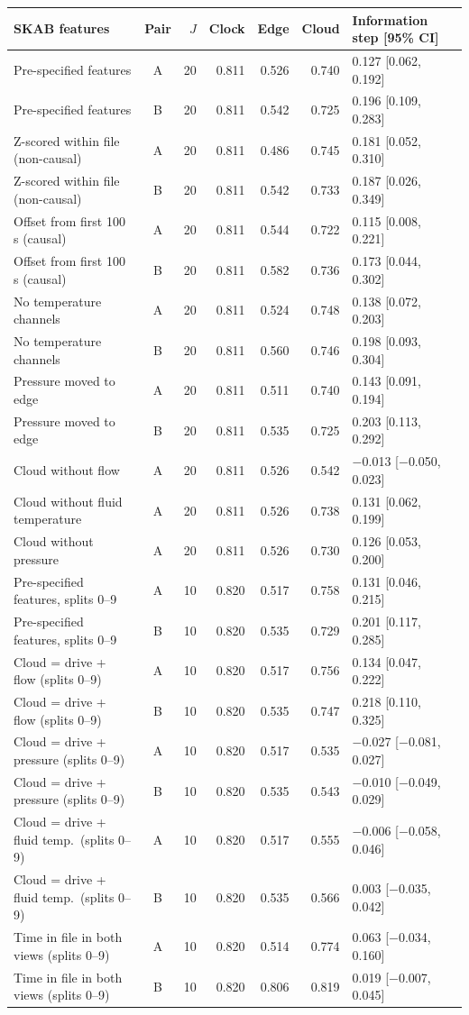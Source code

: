 \begin{tabular}{@{}l c r rrr l@{}}
\toprule
SKAB features & Pair & $J$ & Clock & Edge & Cloud & Information step [95\% CI] \\
\midrule
Pre-specified features & A & 20 & 0.811 & 0.526 & 0.740 & 0.127 [0.062, 0.192] \\
Pre-specified features & B & 20 & 0.811 & 0.542 & 0.725 & 0.196 [0.109, 0.283] \\
Z-scored within file (non-causal) & A & 20 & 0.811 & 0.486 & 0.745 & 0.181 [0.052, 0.310] \\
Z-scored within file (non-causal) & B & 20 & 0.811 & 0.542 & 0.733 & 0.187 [0.026, 0.349] \\
Offset from first 100 s (causal) & A & 20 & 0.811 & 0.544 & 0.722 & 0.115 [0.008, 0.221] \\
Offset from first 100 s (causal) & B & 20 & 0.811 & 0.582 & 0.736 & 0.173 [0.044, 0.302] \\
No temperature channels & A & 20 & 0.811 & 0.524 & 0.748 & 0.138 [0.072, 0.203] \\
No temperature channels & B & 20 & 0.811 & 0.560 & 0.746 & 0.198 [0.093, 0.304] \\
Pressure moved to edge & A & 20 & 0.811 & 0.511 & 0.740 & 0.143 [0.091, 0.194] \\
Pressure moved to edge & B & 20 & 0.811 & 0.535 & 0.725 & 0.203 [0.113, 0.292] \\
Cloud without flow & A & 20 & 0.811 & 0.526 & 0.542 & $-$0.013 [$-$0.050, 0.023] \\
Cloud without fluid temperature & A & 20 & 0.811 & 0.526 & 0.738 & 0.131 [0.062, 0.199] \\
Cloud without pressure & A & 20 & 0.811 & 0.526 & 0.730 & 0.126 [0.053, 0.200] \\
Pre-specified features, splits 0--9 & A & 10 & 0.820 & 0.517 & 0.758 & 0.131 [0.046, 0.215] \\
Pre-specified features, splits 0--9 & B & 10 & 0.820 & 0.535 & 0.729 & 0.201 [0.117, 0.285] \\
Cloud = drive + flow (splits 0--9) & A & 10 & 0.820 & 0.517 & 0.756 & 0.134 [0.047, 0.222] \\
Cloud = drive + flow (splits 0--9) & B & 10 & 0.820 & 0.535 & 0.747 & 0.218 [0.110, 0.325] \\
Cloud = drive + pressure (splits 0--9) & A & 10 & 0.820 & 0.517 & 0.535 & $-$0.027 [$-$0.081, 0.027] \\
Cloud = drive + pressure (splits 0--9) & B & 10 & 0.820 & 0.535 & 0.543 & $-$0.010 [$-$0.049, 0.029] \\
Cloud = drive + fluid temp.\ (splits 0--9) & A & 10 & 0.820 & 0.517 & 0.555 & $-$0.006 [$-$0.058, 0.046] \\
Cloud = drive + fluid temp.\ (splits 0--9) & B & 10 & 0.820 & 0.535 & 0.566 & 0.003 [$-$0.035, 0.042] \\
Time in file in both views (splits 0--9) & A & 10 & 0.820 & 0.514 & 0.774 & 0.063 [$-$0.034, 0.160] \\
Time in file in both views (splits 0--9) & B & 10 & 0.820 & 0.806 & 0.819 & 0.019 [$-$0.007, 0.045] \\
\bottomrule
\end{tabular}
